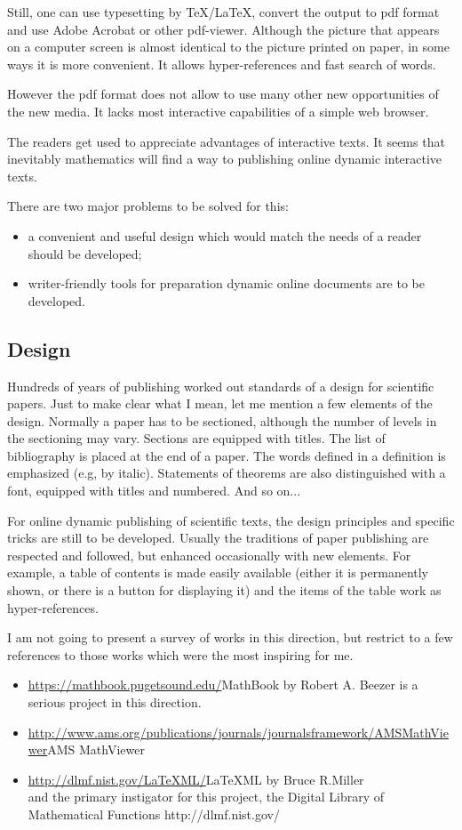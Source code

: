 \documentclass{article}
\begin{document}
Still, one can use typesetting by TeX/LaTeX, convert the output to pdf format
and use Adobe Acrobat or other pdf-viewer. Although the picture that
appears on a computer screen is almost identical to the picture printed on 
paper, in some ways it is more convenient. It allows hyper-references and 
fast search of words.

However the pdf format does not allow to use many other new opportunities 
of the new media. It lacks most interactive capabilities of a 
simple web browser. 

The readers get used to appreciate advantages of interactive
texts. It seems that inevitably mathematics will find a way to publishing
online dynamic interactive texts.

There are two major problems to be solved for this:
\begin{itemize}
\item a convenient and useful design which would match the needs of a 
reader should be developed;
\item writer-friendly tools for preparation dynamic online documents
are to be developed.
\end{itemize}

\subsection{Design}\label{s4.2}
Hundreds of years of publishing worked out standards of a design 
for scientific papers. Just to make clear what I mean, let me mention 
a few elements of the design. Normally a paper has to be sectioned, 
although the number of levels in the sectioning may vary. 
Sections are equipped with titles. The list of bibliography is placed 
at the end of a paper.
The words defined in a definition is emphasized (e.g, by italic).
Statements of theorems are also distinguished with a font, equipped with 
titles and numbered. And so on...

For online dynamic publishing of scientific texts, the design principles 
and specific tricks are still to be developed. Usually the traditions of 
paper publishing are respected and followed, but enhanced occasionally 
with new elements. 
For example, a table of contents is made easily available (either it is 
permanently shown, or there is a button for displaying it) and the items 
of the table work as hyper-references.

I am not going to present a survey of works in this  direction, but
restrict to a few references to those works which were the most 
inspiring for me. 
\begin{itemize} 
\item\url{https://mathbook.pugetsound.edu/}{MathBook} by Robert A. Beezer is a
serious project in this direction.
\item 
\url{http://www.ams.org/publications/journals/journalsframework/AMSMathViewer}{AMS
MathViewer}
\item
\url{http://dlmf.nist.gov/LaTeXML/}{LaTeXML} by Bruce R.Miller\\ 
and the primary instigator for this project, the Digital Library of Mathematical Functions  
http://dlmf.nist.gov/
\end{itemize}
\end{document}
